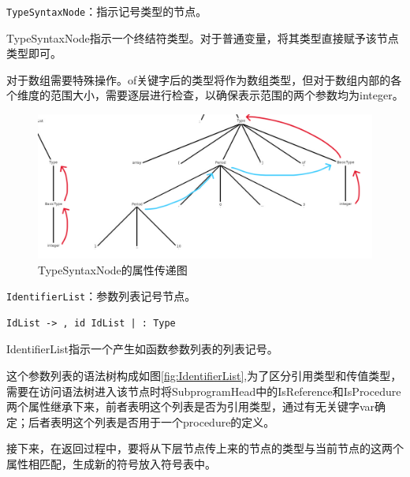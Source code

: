 \documentclass[../main.tex]{subfiles}
\begin{document}
\texttt{TypeSyntaxNode}：指示记号类型的节点。

TypeSyntaxNode指示一个终结符类型。对于普通变量，将其类型直接赋予该节点类型即可。

对于数组需要特殊操作。of关键字后的类型将作为数组类型，但对于数组内部的各个维度的范围大小，需要逐层进行检查，以确保表示范围的两个参数均为integer。

\begin{figure}[h]
\centering
\includegraphics[width=0.8\linewidth ]{assets/类型检查/TypeSyntaxNode.png}
\caption{TypeSyntaxNode的属性传递图}
\label{fig:TypeSyntaxNode}
\end{figure}

\texttt{IdentifierList}：参数列表记号节点。

\begin{lstlisting}[style=grammar]
IdList -> , id IdList | : Type
\end{lstlisting}

IdentifierList指示一个产生如函数参数列表的列表记号。

这个参数列表的语法树构成如图\ref{fig:IdentifierList},为了区分引用类型和传值类型，需要在访问语法树进入该节点时将SubprogramHead中的IsReference和IsProcedure两个属性继承下来，前者表明这个列表是否为引用类型，通过有无关键字var确定；后者表明这个列表是否用于一个procedure的定义。

接下来，在返回过程中，要将从下层节点传上来的节点的类型与当前节点的这两个属性相匹配，生成新的符号放入符号表中。
\end{document}
